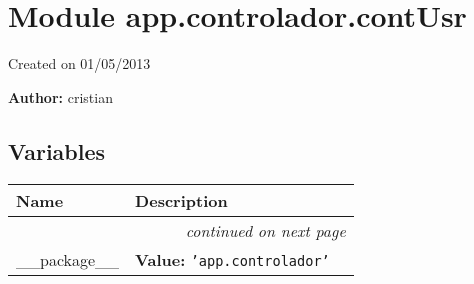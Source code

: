 %
%
%


\section{Module app.controlador.contUsr}

    \label{app:controlador:contUsr}
Created on 01/05/2013

\textbf{Author:} cristian





  \subsection{Variables}

    \vspace{-1cm}
\hspace{\varindent}\begin{longtable}{|p{\varnamewidth}|p{\vardescrwidth}|l}
\cline{1-2}
\cline{1-2} \centering \textbf{Name} & \centering \textbf{Description}& \\
\cline{1-2}
\endhead\cline{1-2}\multicolumn{3}{r}{\small\textit{continued on next page}}\\\endfoot\cline{1-2}
\endlastfoot\raggedright \_\-\_\-p\-a\-c\-k\-a\-g\-e\-\_\-\_\- & \raggedright \textbf{Value:} 
{\tt \texttt{'}\texttt{app.controlador}\texttt{'}}&\\
\cline{1-2}
\end{longtable}



